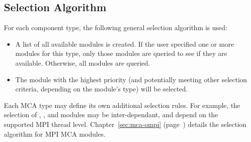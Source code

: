 
\subsection{Selection Algorithm}

For each component type, the following general selection algorithm is
used:

\begin{itemize}
\item A list of all available modules is created.  If the user
  specified one or more modules for this type, only those modules are
  queried to see if they are available.  Otherwise, all modules are
  queried.
  
\item The module with the highest priority (and potentially meeting
  other selection criteria, depending on the module's type) will be
  selected.
\end{itemize}

Each MCA type may define its own additional selection rules.  For
example, the selection of , , and 
modules may be inter-dependant, and depend on the supported MPI thread
level.  Chapter~\ref{sec:mca-ompi} (page~\pageref{sec:mca-ompi})
details the selection algorithm for MPI MCA modules.

